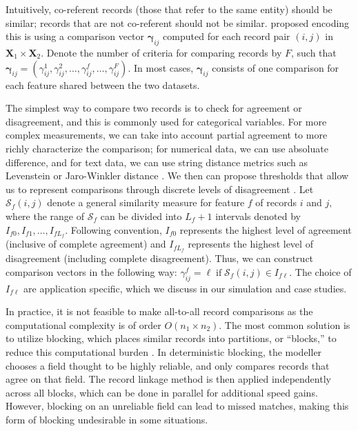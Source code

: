 \documentclass[ba]{imsart}
\begin{document}

Intuitively, co-referent records (those that refer to the same entity) should be similar; records that are not co-referent should not be similar. \cite{fellegi_theory_1969} proposed encoding this is using a comparison vector $\bm{\gamma}_{ij}$ computed for each record pair $(i,j)$ in $\bm{X}_1 \times \bm{X}_2.$ Denote the number of criteria for comparing records by $F$, such that $\bm{\gamma}_{ij} = (\gamma_{ij}^1, \gamma_{ij}^2, \ldots, \gamma_{ij}^f, \ldots, \gamma_{ij}^F).$ In most cases, $\bm{\gamma}_{ij}$ consists of one comparison for each feature shared between the two datasets. 

The simplest way to compare two records is to check for agreement or disagreement, and this is commonly used for categorical variables. For more complex measurements, we can take into account partial agreement to more richly characterize the comparison; for numerical data, we can use absoluate difference, and for text data, we can use string distance metrics such as Levenstein or Jaro-Winkler distance \citep{cohen2003comparison}. We then can propose thresholds that allow us to represent comparisons through discrete levels of disagreement \citep{bilenko2006riddle, elmagarmid_duplicate_2007}. Let $\mathcal{S}_f(i,j)$ denote a general similarity measure for feature $f$ of records $i$ and $j,$ where the range of $\mathcal{S}_f$ can be divided into $L_f +1$ intervals denoted by $I_{f0}, I_{f1}, \ldots, I_{fL_f}$. Following convention, $I_{f0}$ represents the highest level of agreement (inclusive of complete agreement) and $I_{fL_f}$ represents the highest level of disagreement (including complete disagreement). Thus, we can construct comparison vectors in the following way: 
$\gamma_{ij}^f = \ell \; \text{if} \; \mathcal{S}_f(i,j) \in I_{f\ell}.$
The choice of $I_{f\ell}$ are application specific, which we discuss in our simulation and case studies. 

In practice, it is not feasible to make all-to-all record comparisons as the computational complexity is of order $O(n_1 \times n_2).$ The most common solution is to utilize blocking, which places similar records into partitions, or ``blocks,'' to reduce this computational burden \citep{steorts_comparison_2014, murray2016probabilistic}. In deterministic blocking, the modeller chooses a field thought to be highly reliable, and only compares records that agree on that field. The record linkage method is then applied independently across all blocks, which can be done in parallel for additional speed gains. However, blocking on an unreliable field can lead to missed matches, making this form of blocking undesirable in some situations.
\end{document}
